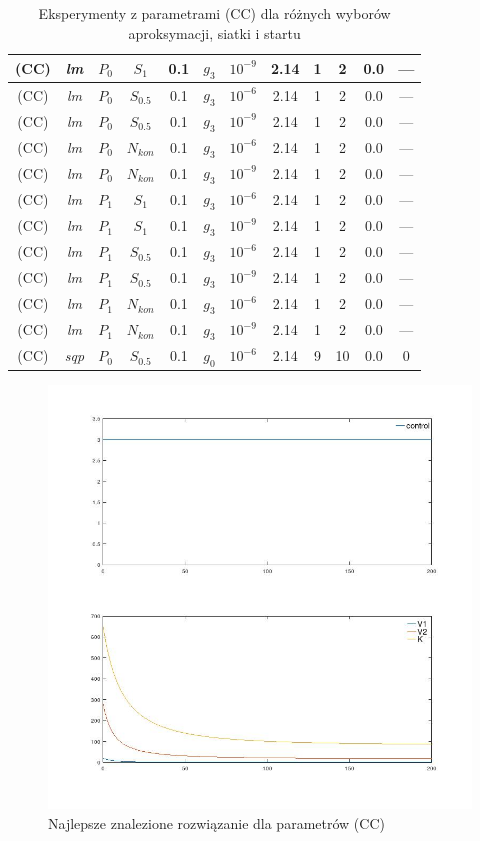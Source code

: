 \documentclass[licencjacka]{pracamgr}
\begin{document}
\begin{table}[h]
\begin{center}
\begin{tabular}{|c|c|c|c|c|c|c||c|c|c|c|c|}
      \hline
      (CC) & {\it lm\/} & $P_0$ & $S_1$ & 0.1 & $g_3$ & $10^{-9}$ & 2.14 & 1 & 2 & 0.0 & --- \\
      \hline
      (CC) & {\it lm\/} & $P_0$ & $S_{0.5}$ & 0.1 & $g_3$ & $10^{-6}$ & 2.14 & 1 & 2 & 0.0 & --- \\
      \hline
      (CC) & {\it lm\/} & $P_0$ & $S_{0.5}$ & 0.1 & $g_3$ & $10^{-9}$ & 2.14 & 1 & 2 & 0.0 & --- \\
      \hline
      (CC) & {\it lm\/} & $P_0$ & $N_{kon}$ & 0.1 & $g_3$ & $10^{-6}$ & 2.14 & 1 & 2 & 0.0 & --- \\
      \hline
      (CC) & {\it lm\/} & $P_0$ & $N_{kon}$ & 0.1 & $g_3$ & $10^{-9}$ & 2.14 & 1 & 2 & 0.0 & --- \\
      \hline
      (CC) & {\it lm\/} & $P_1$ & $S_1$ & 0.1 & $g_3$ & $10^{-6}$ & 2.14 & 1 & 2 & 0.0 & --- \\
      \hline
      (CC) & {\it lm\/} & $P_1$ & $S_1$ & 0.1 & $g_3$ & $10^{-9}$ & 2.14 & 1 & 2 & 0.0 & --- \\
      \hline
      (CC) & {\it lm\/} & $P_1$ & $S_{0.5}$ & 0.1 & $g_3$ & $10^{-6}$ & 2.14 & 1 & 2 & 0.0 & --- \\
      \hline
      (CC) & {\it lm\/} & $P_1$ & $S_{0.5}$ & 0.1 & $g_3$ & $10^{-9}$ & 2.14 & 1 & 2 & 0.0 & --- \\
      \hline
      (CC) & {\it lm\/} & $P_1$ & $N_{kon}$ & 0.1 & $g_3$ & $10^{-6}$ & 2.14 & 1 & 2 & 0.0 & --- \\
      \hline
      (CC) & {\it lm\/} & $P_1$ & $N_{kon}$ & 0.1 & $g_3$ & $10^{-9}$ & 2.14 & 1 & 2 & 0.0 & --- \\
      \hline
      (CC) & {\it sqp\/} & $P_0$ & $S_{0.5}$ & 0.1 & $g_0$ & $10^{-6}$ & 2.14 & 9 & 10 & 0.0 & 0 \\
      \hline
    \end{tabular}
    \caption{Eksperymenty z parametrami (CC) dla różnych wyborów aproksymacji, siatki i startu}\label{param1_tbl}
  \end{center}
\end{table}

\begin{figure}[h]
  \centering
  \includegraphics[width=.5\textwidth]{../plots/plot_max}
  \caption{Najlepsze znalezione rozwiązanie dla parametrów (CC)}\label{max_plot}
\end{figure}
\end{document}
